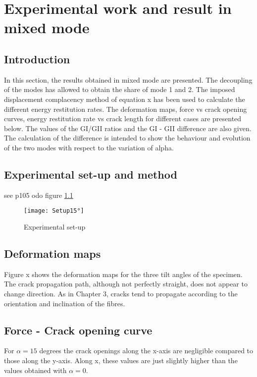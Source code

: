 \chapter{Experimental work and result in mixed mode}
\label{Chapter2}

\section{Introduction}

In this section, the results obtained in mixed mode are presented. The decoupling of the modes has allowed to obtain the share of mode 1 and 2. The imposed displacement complacency method of equation x has been used to calculate the different energy restitution rates. The deformation maps, force vs crack opening curves, energy restitution rate vs crack length for different cases are presented below. The values of the GI/GII ratios and the GI - GII difference are also given. The calculation of the difference is intended to show the behaviour and evolution of the two modes with respect to the variation of alpha.

\section{Experimental set-up and method}

see p105 odo
figure \ref{fig:Setup15°}


\begin{figure}[htp]
	\centering
	\texttt{[image: Setup15°]}
	\caption{Experimental set-up}
	\label{fig:Setup15°}
\end{figure}

\section{Deformation maps}

Figure x shows the deformation maps for the three tilt angles of the specimen. The crack propagation path, although not perfectly straight, does not appear to change direction. As in Chapter 3, cracks tend to propagate according to the orientation and inclination of the fibres.

\section{Force - Crack opening curve}

For $\alpha=15$ degrees the crack openings along the x-axis are negligible compared to those along the y-axis. Along x, these values are just slightly higher than the values obtained with $\alpha=0$.

